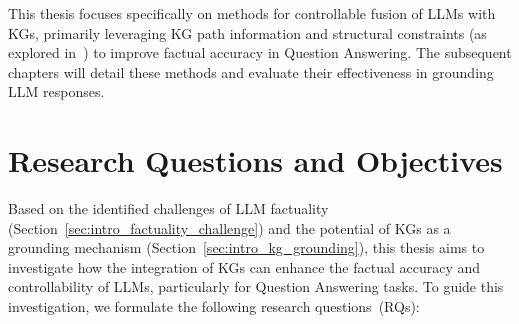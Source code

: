 This thesis focuses specifically on methods for controllable fusion of LLMs with KGs, primarily leveraging KG path information and structural constraints (as explored in~\cite{DBLP:journals/corr/abs-2310-07008, DBLP:journals/corr/abs-2310-02166}) to improve factual accuracy in Question Answering. The subsequent chapters will detail these methods and evaluate their effectiveness in grounding LLM responses.

\section{Research Questions and Objectives}
\label{sec:intro_research_questions}

Based on the identified challenges of LLM factuality (Section~\ref{sec:intro_factuality_challenge}) and the potential of KGs as a grounding mechanism (Section~\ref{sec:intro_kg_grounding}), this thesis aims to investigate how the integration of KGs can enhance the factual accuracy and controllability of LLMs, particularly for Question Answering tasks. To guide this investigation, we formulate the following research questions~(RQs):

